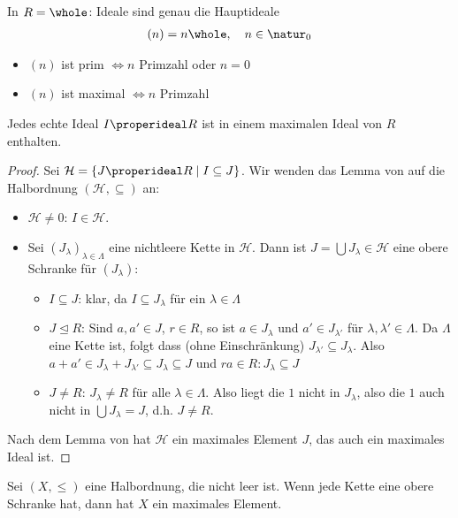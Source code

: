 \begin{example}
	In $R = \whole$: Ideale sind genau die Hauptideale
	\begin{align}
		(n) = n\whole,\quad n \in \natur_0\notag
	\end{align}
	\begin{itemize}
		\item $(n)$ ist prim $\Leftrightarrow n$ Primzahl oder $n = 0$
		\item $(n)$ ist maximal $\Leftrightarrow n$ Primzahl
	\end{itemize}
\end{example}

\begin{proposition}
	Jedes echte Ideal $I \properideal R$ ist in einem maximalen Ideal von $R$ enthalten.
\end{proposition}
\begin{proof}
	Sei $\mathcal{H} = \{ J \properideal R \mid I \subseteq J\}$. Wir wenden das Lemma von  auf die Halbordnung $(\mathcal{H},\subseteq)$ an:
	\begin{itemize}
		\item $\mathcal{H} \neq 0$: $I \in \mathcal{H}$.
		\item Sei $(J_{\lambda})_{\lambda \in \Lambda}$ eine nichtleere Kette in $\mathcal{H}$. Dann ist $J = \bigcup J_{\lambda} \in \mathcal{H}$ eine obere Schranke für $(J_{\lambda})$:
		\begin{itemize}
			\item $I \subseteq J$: klar, da $I \subseteq J_{\lambda}$ für ein $\lambda \in \Lambda$
			\item $J \unlhd R$: Sind $a,a' \in J$, $r \in R$, so ist $a \in J_{\lambda}$ und $a' \in J_{\lambda'}$ für $\lambda, \lambda' \in \Lambda$. Da $\Lambda$ eine Kette ist, folgt dass (ohne Einschränkung) $J_{\lambda'} \subseteq J_{\lambda}$. Also $a+a' \in J_{\lambda} + J_{\lambda'} \subseteq J_{\lambda} \subseteq J$ und $ra \in R: J_{\lambda} \subseteq J$
			\item $J \neq R$: $J_{\lambda} \neq R$ für alle $\lambda \in \Lambda$. Also liegt die $1$ nicht in $J_{\lambda}$, also die $1$ auch nicht in $\bigcup J_{\lambda} = J$, d.h. $J \neq R.$
		\end{itemize}
	\end{itemize}
	Nach dem Lemma von  hat $\mathcal{H}$ ein maximales Element $J$, das auch ein maximales Ideal ist.
\end{proof}

\begin{erinnerung}
	Sei $(X,\le)$ eine Halbordnung, die nicht leer ist. Wenn jede Kette eine obere Schranke hat, dann hat $X$ ein maximales Element.
\end{erinnerung}

